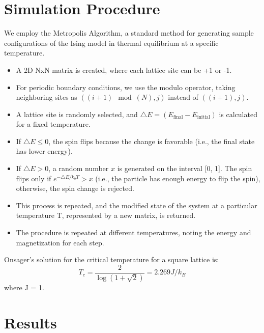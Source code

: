 \documentclass{article}
\begin{document}
\section{Simulation Procedure}
We employ the Metropolis Algorithm, a standard method for generating sample configurations of the Ising model in thermal equilibrium at a specific temperature.
\begin{itemize}
    \item A 2D NxN matrix is created, where each lattice site can be +1 or -1.
    \item For periodic boundary conditions, we use the modulo operator, taking neighboring sites as $((i + 1) \mod (N), j)$ instead of $((i + 1), j)$.
    \item A lattice site is randomly selected, and $\triangle E = (E_{\text{final}} - E_{\text{initial}})$ is calculated for a fixed temperature.
    \item If $\triangle E \leq 0$, the spin flips because the change is favorable (i.e., the final state has lower energy).
    \item If $\triangle E > 0$, a random number $x$ is generated on the interval [0, 1]. The spin flips only if ${e^{-\triangle E/k_{b}T} > x}$ (i.e., the particle has enough energy to flip the spin), otherwise, the spin change is rejected.
    \item This process is repeated, and the modified state of the system at a particular temperature T, represented by a new matrix, is returned.
    \item The procedure is repeated at different temperatures, noting the energy and magnetization for each step.
\end{itemize}

Onsager's solution for the critical temperature for a square lattice is:
\[T_{c} = \frac{2}{\log(1 + \sqrt{2})} = 2.269 J/k_{B}\]
where J = 1.

\section{Results}
\end{document}
